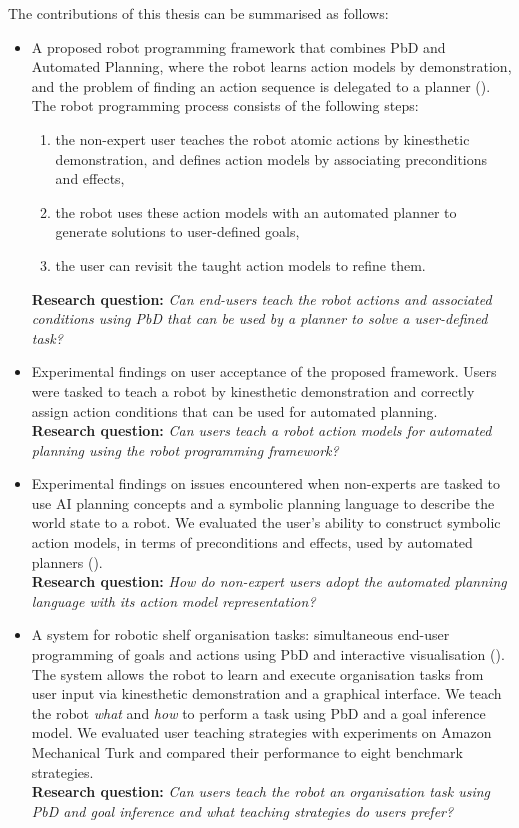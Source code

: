 The contributions of this thesis can be summarised as follows:
\begin{itemize}
	\item {A proposed robot programming framework that combines PbD and Automated Planning, where the robot learns action models by demonstration, and the problem of finding an action sequence is delegated to a planner (\cite{liang2017framework}).
	The robot programming process consists of the following steps:
	\begin{enumerate}
		\item the non-expert user teaches the robot atomic actions by kinesthetic demonstration, and defines {action models} by associating preconditions and effects,
		\item the robot uses these action models with an automated planner to generate solutions to user-defined goals,
		\item the user can revisit the taught action models to refine them.
	\end{enumerate}
	\textbf{Research question:} \textit{Can end-users teach the robot actions and associated conditions using PbD that can be used by a planner to solve a user-defined task?}}
    \item {Experimental findings on user acceptance of the proposed framework. Users were tasked to teach a robot by kinesthetic demonstration and correctly assign action conditions that can be used for automated planning.\\
    \textbf{Research question:} \textit{Can users teach a robot action models for automated planning using the robot programming framework?}}
    \item {Experimental findings on issues encountered when non-experts are tasked to use AI planning concepts and a symbolic planning language to describe the world state to a robot. 
    We evaluated the user's ability to construct symbolic action models, in terms of preconditions and effects, used by automated planners (\cite{liang2017evaluation}).\\
    \textbf{Research question:} \textit{How do non-expert users adopt the automated planning language with its action model representation?}}
    \item {A system for robotic shelf organisation tasks: simultaneous end-user programming of goals and actions using PbD and interactive visualisation (\cite{liang2018simultaneous}).
    The system allows the robot to learn and execute organisation tasks from user input via kinesthetic demonstration and a graphical interface.
    We teach the robot \textit{what} and \textit{how} to perform a task using PbD and a goal inference model.
    We evaluated user teaching strategies with experiments on Amazon Mechanical Turk and compared their performance to eight benchmark strategies.\\
    \textbf{Research question:} \textit{Can users teach the robot an organisation task using PbD and goal inference and what teaching strategies do users prefer?}}
\end{itemize}
